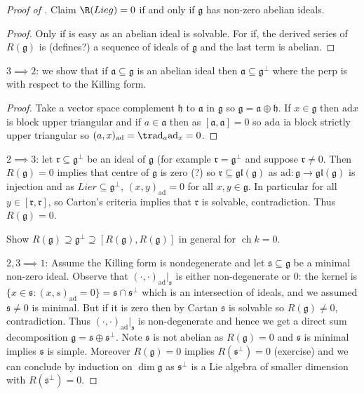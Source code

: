 \documentclass[a4paper]{article}
\newcommand*{\Lie}[1]{\mathfrak{#1}} %
\newcommand{\ad}{\mathrm{ad}} %
\DeclareMathOperator{\cha}{ch} %
\begin{document}
\begin{proof}[Proof of ]
  Claim \(\R(Lie g) = 0\) if and only if \(\Lie g\) has non-zero abelian ideals.
  \begin{proof}
    Only if is easy as an abelian ideal is solvable. For if, the derived series of \(R(\Lie g)\) is (defines?) a sequence of ideals of \(\Lie g\) and the last term is abelian.
  \end{proof}

  \(3 \implies 2\): we show that if \(\Lie a \subseteq \Lie g\) is an abelian ideal then \(\Lie a \subseteq \Lie g^\perp\) where the perp is with respect to the Killing form.
  \begin{proof}
    Take a vector space complement \(\Lie h\) to \(\Lie a\) in \(\Lie g\) so \(\Lie g = \Lie a \oplus \Lie h\). If \(x \in \Lie g\) then \(\ad x\) is block upper triangular and if \(a \in \Lie a\) then as \([\Lie a, \Lie a] = 0\) so \(\ad a\) ia block strictly upper triangular so \((a, x)_\ad = \tr \ad_a \ad_x = 0\).
  \end{proof}

  \(2 \implies 3\): let \(\Lie r \subseteq \Lie g^\perp\) be an ideal of \(\Lie g\) (for example \(\Lie r = \Lie g^\perp\) and  suppose \(\Lie r \neq 0\). Then \(R(\Lie g) = 0\) implies that centre of \(\Lie g\) is zero (?) so \(\Lie r \subseteq \Lie{gl}(\Lie g)\) as \(\ad: \Lie g \to \Lie{gl}(\Lie g)\) is injection and as \(Lie r \subseteq \Lie g^\perp\), \((x, y)_\ad = 0\) for all \(x, y \in \Lie g\). In particular for all \(y \in [\Lie r, \Lie r]\), so Carton's criteria implies that \(\Lie r\) is solvable, contradiction. Thus \(R(\Lie g) = 0\).

  \begin{ex}
    Show \(R(\Lie g) \supseteq \Lie g^\perp \supseteq [R(\Lie g), R(\Lie g)]\) in general for \(\cha k = 0\).
  \end{ex}

  \(2, 3 \implies 1\): Assume the Killing form is nondegenerate and let \(\Lie s \subseteq \Lie g\) be a minimal non-zero ideal. Observe that \((\cdot, \cdot)_\ad|_{\Lie s}\) is either non-degenerate or \(0\): the kernel is \(\{x \in \Lie s: (x, s)_\ad = 0\} = \Lie s \cap \Lie s^\perp\) which is an intersection of ideals, and we assumed \(\Lie s \neq 0\) is minimal. But if it is zero then by Cartan \(\Lie s\) is solvable so \(R(\Lie g) \neq 0\), contradiction. Thus \((\cdot, \cdot)_\ad|_{\Lie s}\) is non-degenerate and hence we get a direct sum decomposition \(\Lie g = \Lie s \oplus \Lie s^\perp\). Note \(\Lie s\) is not abelian as \(R(\Lie g) = 0\) and \(\Lie s\) is minimal implies \(\Lie s\) is simple. Moreover \(R(\Lie g) = 0\) implies \(R(\Lie s^\perp) = 0\) (exercise) and we can conclude by induction on \(\dim \Lie g\) as \(\Lie s^\perp\) is a Lie algebra of smaller dimension with \(R(\Lie s^\perp) = 0\).


\end{proof}
\end{document}

